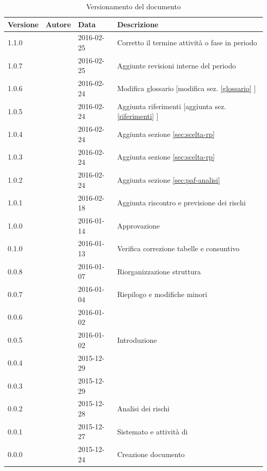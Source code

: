 \documentclass[12pt,a4paper]{article}
\begin{document}
\begin{table}[H]
\begin{center}

\begin{tabular}{p{} p{} p{} p{}}
	\toprule
	\textbf{Versione}	&	\textbf{Autore}	&	\textbf{Data}	&	\textbf{Descrizione}\\
	\midrule
	\midrule
	1.1.0 & \AVE{} & 2016-02-25 & Corretto il termine attività o fase in periodo \\
	\midrule
	1.0.7 & \AB{} & 2016-02-25 & Aggiunte revisioni interne del periodo \FP\  \\
	\midrule
	1.0.6 & \AB{} & 2016-02-24 & Modifica glossario [modifica sez. \ref{glossario} ] \\
	\midrule
	1.0.5 & \AB{} & 2016-02-24 & Aggiunta riferimenti [aggiunta sez. \ref{riferimenti} ] \\
	\midrule
	1.0.4 & \TP{} & 2016-02-24 & Aggiunta sezione \ref{sec:scelta-rp} \\
    \midrule
    1.0.3 & \TP{} & 2016-02-24 & Aggiunta sezione \ref{sec:scelta-rp} \\
    \midrule
    1.0.2 & \TP{} & 2016-02-24 & Aggiunta sezione \ref{sec:paf-analisi} \\
	\midrule
	1.0.1 & \TP{} & 2016-02-18 & Aggiunta riscontro e previsione dei rischi \\
	\midrule
	1.0.0 & \NDC{} & 2016-01-14 & Approvazione \\
	\midrule
	0.1.0 & \AVE{} & 2016-01-13 & Verifica correzione tabelle e consuntivo  \FA{} \\
	\midrule
    0.0.8 & \TP{} & 2016-01-07 & Riorganizzazione struttura \\
    \midrule
	0.0.7 & \NDC{} & 2016-01-04 & Riepilogo e modifiche minori \\
	\midrule
	0.0.6 & \WS{} & 2016-01-02 &  \FVV{} \\
	\midrule
	0.0.5 & \WS{} & 2016-01-02 &  Introduzione \\
	\midrule
	0.0.4 & \TP{} & 2015-12-29 &  \FPDC{} \\
	\midrule
	0.0.3 & \TP{} & 2015-12-29 &  \FPA{} \\
	\midrule
	0.0.2 & \NDC{} & 2015-12-28 &  Analisi dei rischi \\
	\midrule
	0.0.1 & \NDC{} & 2015-12-27 &  Sistemato \mgls{template} e attività di \FA{} \\
	\midrule
	0.0.0 & \NDC{} & 2015-12-24 &  Creazione documento \\
	\bottomrule
\end{tabular}
\caption{Versionamento del documento}
\label{tabVers1}
\end{center}
\end{table}
\newpage
\end{document}
